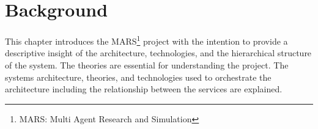 \newpage
\chapter{Background}
	
This chapter introduces the MARS\footnote{MARS: Multi Agent Research and Simulation} project with the intention to provide a descriptive insight
of the architecture, technologies, and the hierarchical structure of the system. The theories are essential for understanding the project. 
The systems architecture, theories, and technologies used to orchestrate the architecture including the 
relationship between the services are explained.

	
	
	
	